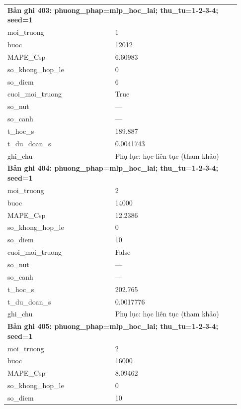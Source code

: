 \begin{longtable}{p{0.43\linewidth}p{0.50\linewidth}}
\midrule
\multicolumn{2}{p{0.95\linewidth}}{\textbf{Bản ghi 403: phuong\_phap=mlp\_hoc\_lai; thu\_tu=1-2-3-4; seed=1}} \\
moi\_\allowbreak truong & 1 \\
buoc & 12012 \\
MAPE\_\allowbreak Csp & 6.60983 \\
so\_\allowbreak khong\_\allowbreak hop\_\allowbreak le & 0 \\
so\_\allowbreak diem & 6 \\
cuoi\_\allowbreak moi\_\allowbreak truong & True \\
so\_\allowbreak nut & — \\
so\_\allowbreak canh & — \\
t\_\allowbreak hoc\_\allowbreak s & 189.887 \\
t\_\allowbreak du\_\allowbreak doan\_\allowbreak s & 0.0041743 \\
ghi\_\allowbreak chu & Phụ lục: học liên tục (tham khảo) \\
\midrule
\multicolumn{2}{p{0.95\linewidth}}{\textbf{Bản ghi 404: phuong\_phap=mlp\_hoc\_lai; thu\_tu=1-2-3-4; seed=1}} \\
moi\_\allowbreak truong & 2 \\
buoc & 14000 \\
MAPE\_\allowbreak Csp & 12.2386 \\
so\_\allowbreak khong\_\allowbreak hop\_\allowbreak le & 0 \\
so\_\allowbreak diem & 10 \\
cuoi\_\allowbreak moi\_\allowbreak truong & False \\
so\_\allowbreak nut & — \\
so\_\allowbreak canh & — \\
t\_\allowbreak hoc\_\allowbreak s & 202.765 \\
t\_\allowbreak du\_\allowbreak doan\_\allowbreak s & 0.0017776 \\
ghi\_\allowbreak chu & Phụ lục: học liên tục (tham khảo) \\
\midrule
\multicolumn{2}{p{0.95\linewidth}}{\textbf{Bản ghi 405: phuong\_phap=mlp\_hoc\_lai; thu\_tu=1-2-3-4; seed=1}} \\
moi\_\allowbreak truong & 2 \\
buoc & 16000 \\
MAPE\_\allowbreak Csp & 8.09462 \\
so\_\allowbreak khong\_\allowbreak hop\_\allowbreak le & 0 \\
so\_\allowbreak diem & 10 \\

\end{longtable}
